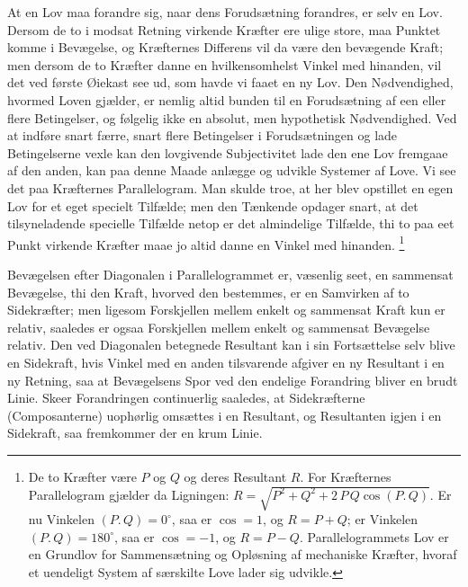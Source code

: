 \documentclass[12pt,a4paper]{book}
\begin{document}
At en Lov maa forandre sig, naar dens Forudsætning forandres, er selv en
Lov. Dersom de to i modsat Retning virkende Kræfter ere ulige store, maa
Punktet komme i Bevægelse, og Kræfternes Differens vil da være den
bevægende Kraft; men dersom de to Kræfter danne en hvilkensomhelst
Vinkel med hinanden, vil det ved første Øiekast see ud, som havde vi
faaet en ny Lov. Den Nødvendighed, hvormed Loven gjælder, er nemlig
altid bunden til en Forudsætning af een eller flere Betingelser, og
følgelig ikke en absolut, men hypothetisk Nødvendighed. Ved at indføre
snart færre, snart flere Betingelser i Forudsætningen og lade
Betingelserne vexle kan den lovgivende Subjectivitet lade den ene Lov
fremgaae af den anden, kan paa denne Maade anlægge og udvikle Systemer
af Love. Vi see det paa Kræfternes Parallelogram. Man skulde troe, at
her blev opstillet en egen Lov for et eget specielt Tilfælde; men den
Tænkende opdager snart, at det tilsyneladende specielle Tilfælde netop
er det almindelige Tilfælde, thi to paa eet
Punkt virkende Kræfter maae jo altid danne en Vinkel med hinanden.%
\footnote{De to Kræfter være $P$ og $Q$ og deres Resultant $R$. For
Kræfternes Parallelogram gjælder da Ligningen:
$R = \sqrt{P^2 + Q^2 + 2\,P\,Q \cos (P.\,Q)}$. Er nu Vinkelen
$(P.\,Q) = 0^{\circ}$, saa er $\cos = 1$, og $R = P + Q$; er Vinkelen
$(P.\,Q) = 180^{\circ}$, saa er $\cos = -1$, og $R = P-Q$.
Parallelogrammets Lov er en Grundlov for Sammensætning og Opløsning af
mechaniske Kræfter, hvoraf et uendeligt System af særskilte Love lader
sig udvikle.}

Bevægelsen efter Diagonalen i Parallelogrammet er, væsenlig seet, en
sammensat Bevægelse, thi den Kraft, hvorved den bestemmes, er en
Samvirken af to Sidekræfter; men ligesom Forskjellen mellem enkelt og
sammensat Kraft kun er relativ, saaledes er ogsaa Forskjellen mellem
enkelt og sammensat Bevægelse relativ. Den ved Diagonalen betegnede
Resultant kan i sin Fortsættelse selv blive en Sidekraft, hvis Vinkel
med en anden tilsvarende afgiver en ny Resultant i en ny Retning, saa at
Bevægelsens Spor ved den endelige Forandring bliver en brudt Linie.
Skeer Forandringen continuerlig saaledes, at Sidekræfterne
(Composanterne) uophørlig omsættes i en Resultant, og Resultanten igjen
i en Sidekraft, saa fremkommer der en krum Linie.
\end{document}
